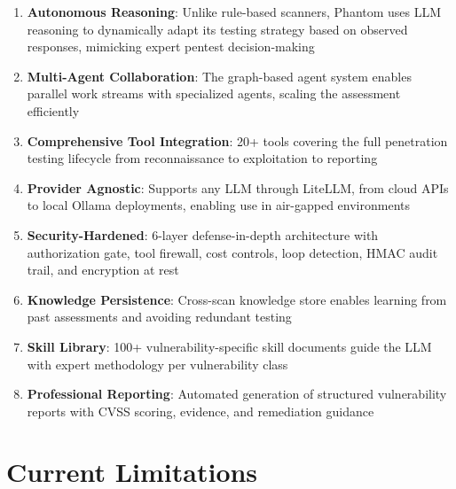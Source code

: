 \documentclass[12pt,a4paper]{article}
\begin{document}
\begin{enumerate}
    \item \textbf{Autonomous Reasoning}: Unlike rule-based scanners, Phantom
          uses LLM reasoning to dynamically adapt its testing strategy based
          on observed responses, mimicking expert pentest decision-making
    
    \item \textbf{Multi-Agent Collaboration}: The graph-based agent system
          enables parallel work streams with specialized agents, scaling
          the assessment efficiently
    
    \item \textbf{Comprehensive Tool Integration}: 20+ tools covering the
          full penetration testing lifecycle from reconnaissance to
          exploitation to reporting
    
    \item \textbf{Provider Agnostic}: Supports any LLM through LiteLLM,
          from cloud APIs to local Ollama deployments, enabling use in
          air-gapped environments
    
    \item \textbf{Security-Hardened}: 6-layer defense-in-depth architecture
          with authorization gate, tool firewall, cost controls, loop
          detection, HMAC audit trail, and encryption at rest
    
    \item \textbf{Knowledge Persistence}: Cross-scan knowledge store enables
          learning from past assessments and avoiding redundant testing
    
    \item \textbf{Skill Library}: 100+ vulnerability-specific skill documents
          guide the LLM with expert methodology per vulnerability class
    
    \item \textbf{Professional Reporting}: Automated generation of
          structured vulnerability reports with CVSS scoring, evidence,
          and remediation guidance
\end{enumerate}

\section{Current Limitations}
\end{document}
